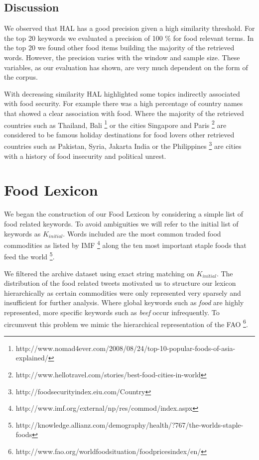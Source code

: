  
\subsection{Discussion}

We observed that HAL has a good precision given a high similarity threshold. For the top 20 keywords we evaluated a precision of 100 \% for food relevant terms. In the top 20 we found other food items building the majority of the retrieved words. However, the precision varies with the window and sample size. These variables, as our evaluation has shown, are very much dependent on the form of the corpus.  

With decreasing similarity HAL highlighted some topics indirectly associated with food security. For example there was a high percentage of country names that showed a clear association with food. Where the majority of the retrieved countries such as Thailand, Bali \footnote{http://www.nomad4ever.com/2008/08/24/top-10-popular-foods-of-asia-explained/} or the cities Singapore and Paris \footnote{http://www.hellotravel.com/stories/best-food-cities-in-world} are considered to be famous holiday destinations for food lovers other retrieved countries such as Pakistan, Syria, Jakarta India or the Philippines \footnote{http://foodsecurityindex.eiu.com/Country} are cities with a history of food insecurity and political unrest. 





\section{Food Lexicon}
\label{food_lex}

We began the construction of our Food Lexicon by considering  a simple list of food related keywords. To avoid ambiguities we will refer to the initial list of keywords as $K_{initial}$. Words included are the most common traded food commodities as listed by IMF \footnote{http://www.imf.org/external/np/res/commod/index.aspx} along the ten most important staple foods that feed the world \footnote{http://knowledge.allianz.com/demography/health/?767/the-worlds-staple-foods}. 

We filtered the archive dataset using exact string matching on $K_{initial}$. The distribution of the food related tweets motivated us to structure our lexicon hierarchically as certain commodities were only represented very sparsely and insufficient for further analysis. Where global keywords such as \emph{food} are highly represented, more specific keywords such as \emph{beef} occur infrequently. To circumvent this problem we mimic the hierarchical representation of the FAO   \footnote{http://www.fao.org/worldfoodsituation/foodpricesindex/en/}. 

